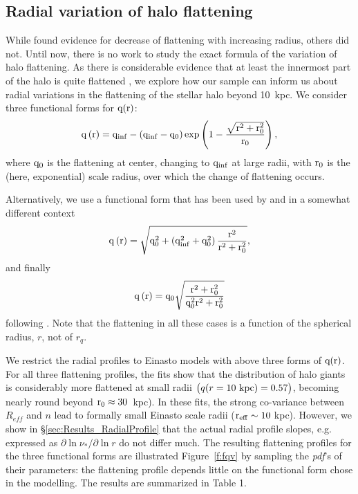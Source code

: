 \documentclass[12pt,preprint]{aastex}
\begin{document}
\subsection{Radial variation of halo flattening}\label{sec:Results_FlatteningVariations}
While \citet{Preston1991} found evidence for decrease of flattening with increasing radius, others did not\citep{Sluis1998,Sesar2011,Deason2011}.  Until now, there is no work to study the exact formula of the variation of halo flattening.  As there is considerable evidence that at least the innermost part of the halo is quite flattened \citep{Carollo2010}, we explore how our sample can inform us about radial variations in the flattening of the stellar halo beyond 10~kpc. We consider three functional forms for $\rm q(r)$:
\begin{equation}
\rm q\left(r\right)=q_{inf}-\left(q_{inf}-q_0\right)exp\left(1-\frac{\sqrt{r^2+r_0^2}}{r_0}\right),
\end{equation}
where  $\rm q_0$ is the flattening at center, changing to $\rm q_{inf}$ at large radii, with $\rm r_0$ is the (here, exponential) scale radius, over which the change of flattening occurs.

Alternatively, we use a functional form that has been used by \citep{Osipkov1979} and \citep{Merritt1985} in a somewhat different context
\begin{equation}
\rm q\left(r\right)=\sqrt{q_0^2+\left(q_{inf}^2+q_0^2\right)\frac{r^2}{r^2+r_0^2}},
\end{equation}
and finally 
\begin{equation}
\rm q\left(r\right)=q_0\sqrt{\frac{r^2+r_0^2}{q_0^2r^2+r_0^2}}
\end{equation}
following \citet{Sluis1998}. 
Note that the flattening in all these cases is a function of the spherical radius, $r$, not of $r_q$.

We restrict the radial profiles to Einasto models with above three forms of $\rm q(r)$. For all three flattening profiles, the fits show that the distribution of halo giants is considerably more flattened at small radii $\bigl ( q(r=10\rm~kpc)=0.57\bigr )$, becoming nearly round beyond  $\rm r_0\approx 30$~kpc). 
In these fits, the strong co-variance between $R_{eff}$ and $n$ lead to formally small Einasto scale radii ($\rm r_{eff} \sim 10~$kpc). However, we show in \S \ref{sec:Results_RadialProfile} that the actual radial profile slopes, 
e.g. expressed as $\partial{\ln \nu_*}/\partial{\ln r}$ do not differ much.  The resulting flattening profiles 
for the three functional forms are illustrated Figure~\ref{f:fqv} by sampling the \textit{pdf}'s of their parameters:
 the flattening profile depends little on the functional form chose in the modelling. The results are summarized in Table 1.   
\end{document}
